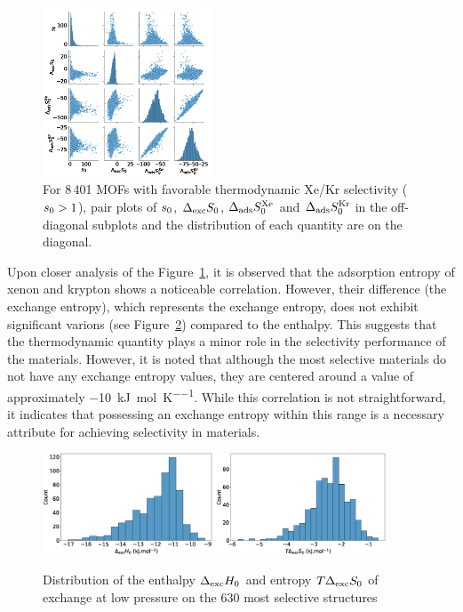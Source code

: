 \documentclass[main.tex]{subfiles}
\begin{document}
\begin{figure}[ht]
  \centering
    \includegraphics[width=0.45\textwidth]{figures/2-thermo/Entropy_0.jpg}
    \caption{For 8\,401 MOFs with favorable thermodynamic Xe/Kr selectivity ($s_{\text{0}} > 1$), pair plots of $s_{\text{0}}$, $\Delta_{\text{exc}}S_{\text{0}}$, $\Delta_{\text{ads}}S^{\text{Xe}}_{\text{0}}$ and $\Delta_{\text{ads}}S^{\text{Kr}}_{\text{0}}$ in the off-diagonal subplots and the distribution of each quantity are on the diagonal.}\label{fgr:SI:HS_0_log}
\end{figure}

Upon closer analysis of the Figure~\ref{fgr:SI:HS_0_log}, it is observed that the adsorption entropy of xenon and krypton shows a noticeable correlation. However, their difference (the exchange entropy), which represents the exchange entropy, does not exhibit significant varions (see Figure~\ref{fgr:SI:dist0}) compared to the enthalpy. This suggests that the thermodynamic quantity plays a minor role in the selectivity performance of the materials. However, it is noted that although the most selective materials do not have any exchange entropy values, they are centered around a value of approximately \SI{-10}{\kilo\joule\per\mole\per\kelvin}. While this correlation is not straightforward, it indicates that possessing an exchange entropy within this range is a necessary attribute for achieving selectivity in materials.
\begin{figure}[ht]
  \centering
    \includegraphics[width=0.45\textwidth]{figures/2-thermo/Delta_H_0.jpg}
    \includegraphics[width=0.45\textwidth]{figures/2-thermo/T_Delta_S_0.jpg}
    \caption{Distribution of the enthalpy $\Delta_{\text{exc}}H_{\text{0}}$ and entropy $T\Delta_{\text{exc}}S_{\text{0}}$ of exchange at low pressure on the 630 most selective structures}\label{fgr:SI:dist0}
\end{figure}
\end{document}
